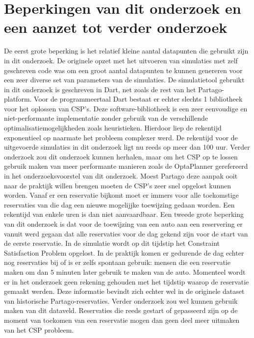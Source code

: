 \section{Beperkingen van dit onderzoek en een aanzet tot verder onderzoek} \label{beperkingen-onderzoek}
De eerst grote beperking is het relatief kleine aantal datapunten die gebruikt zijn in dit onderzoek. De originele opzet met het uitvoeren van simulaties met zelf geschreven code was om een groot aantal datapunten te kunnen genereren voor een zeer diverse set van parameters van de simulaties. De simulatietool gebruikt in dit onderzoek is geschreven in Dart, net zoals de rest van het Partago-platform. Voor de programmeertaal Dart bestaat er echter slechts 1 bibliotheek voor het oplossen van CSP's. Deze software-bibliotheek is een zeer eenvoudige en niet-performante implementatie zonder gebruik van de verschillende optimalisatiemogelijkheden zoals heuristieken. Hierdoor liep de rekentijd exponentieel op naarmate het probleem complexer werd. De rekentijd voor de uitgevoerde simulaties in dit onderzoek ligt nu reeds op meer dan 100 uur. Verder onderzoek zou dit onderzoek kunnen herhalen, maar om het CSP op te lossen gebruik maken van meer performante manieren zoals de OptaPlanner gerefereerd in het onderzoeksvoorstel van dit onderzoek. Moest Partago deze aanpak ooit naar de praktijk willen brengen moeten de CSP's zeer snel opgelost kunnen worden. Vanaf er een reservatie bijkomt moet er immers voor alle toekomstige reservaties van die dag een nieuwe mogelijjke toewijzing gedaan worden. Een rekentijd van enkele uren is dan niet aanvaardbaar. 
Een tweede grote beperking van dit onderzoek is dat voor de toewijzing van een auto aan een reservering er vanuit werd gegaan dat alle reservaties voor de dag gekend zijn voor de start van de eerste reservatie. In de simulatie wordt op dit tijdstip het Constraint Satisfaction Problem opgelost. In de praktijk komen er gedurende de dag echter nog reservaties bij of is er zelfs spontaan gebruik: mensen die een reservatie maken om dan 5 minuten later gebruik te maken van de auto. Momenteel wordt er in het onderzoek geen rekening gehouden met het tijdstip waarop de reservatie gemaakt werden. Deze informatie bevindt zich echter wel in de originele dataset van historische Partago-reservaties. Verder onderzoek zou wel kunnen gebruik maken van dit dataveld. Reservaties die reeds gestart of gepasseerd zijn op de moment van toekomen van een reservatie mogen dan geen deel meer uitmaken van het CSP probleem. 

